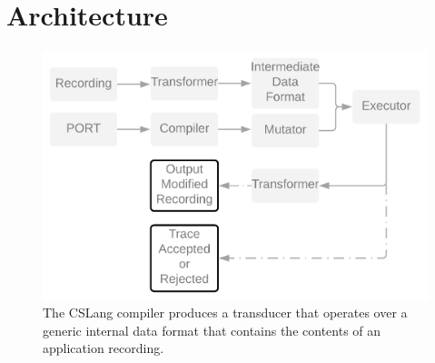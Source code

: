 \section{Architecture}
\label{SEC:architecture}

\begin{figure}
  \includegraphics[scale=.08]{images/architecture}
  \caption{The CSLang compiler produces a transducer that operates over a
  generic internal data format that contains the contents of an application
  recording.}
  \label{fig:architecture}
\end{figure}


